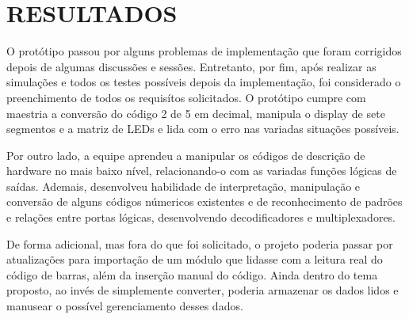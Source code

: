 \chapter{RESULTADOS}
O protótipo passou por alguns problemas de implementação que foram corrigidos depois de algumas discussões e sessões. Entretanto, por fim, após realizar as simulações e todos os testes possíveis depois da implementação, foi considerado o preenchimento de todos os requisítos solicitados. O protótipo cumpre com maestria a conversão do código 2 de 5 em decimal, manipula o display de sete segmentos e a matriz de LEDs e lida com o erro nas variadas situações possíveis.

Por outro lado, a equipe aprendeu a manipular os códigos de descrição de hardware no mais baixo nível, relacionando-o com as variadas funções lógicas de saídas. Ademais, desenvolveu habilidade de interpretação, manipulação e conversão de alguns códigos númericos existentes e de reconhecimento de padrões e relações entre portas lógicas, desenvolvendo decodificadores e multiplexadores.

De forma adicional, mas fora do que foi solicitado, o projeto poderia passar por atualizações para importação de um módulo que lidasse com a leitura real do código de barras, além da inserção manual do código. Ainda dentro do tema proposto, ao invés de simplemente converter, poderia armazenar os dados lidos e manusear o possível gerenciamento desses dados. 